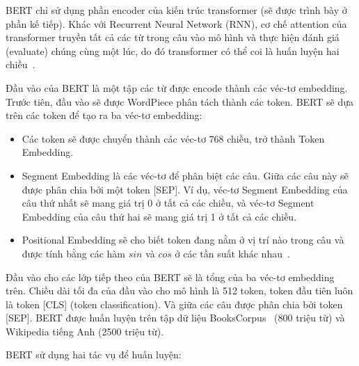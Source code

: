 BERT chỉ sử dụng phần encoder của kiến trúc transformer (sẽ được trình bày ở
phần kế tiếp). Khác với Recurrent Neural Network (RNN), cơ chế attention của
transformer truyền tất cả các từ trong câu vào mô hình và thực hiện đánh giá
(evaluate) chúng cùng một lúc, do đó transformer có thể coi là huấn luyện hai
chiều~\cite{khanhBERTModel2020}.

Đầu vào của BERT là một tập các từ được encode thành các véc-tơ embedding. Trước tiên, đầu vào sẽ được WordPiece phân tách thành các token. BERT sẽ dựa trên các token để tạo ra ba véc-tơ embedding:
\begin{itemize}
	\item Các token sẽ được chuyển thành các véc-tơ 768 chiều, trở thành Token
		Embedding.
	\item Segment Embedding là các véc-tơ để phân biệt các câu. Giữa các câu
		này sẽ được phân chia bởi một token [SEP]. Ví dụ, véc-tơ Segment
		Embedding của câu thứ nhất sẽ mang giá trị 0 ở tất cả các chiều, và
		véc-tơ Segment Embedding của câu thứ hai sẽ mang giá trị 1 ở tất cả các
		chiều.
	\item Positional Embedding sẽ cho biết token đang nằm ở vị trí nào trong
		câu và được tính bằng các hàm $sin$ và $cos$ ở các tần suất khác
		nhau~\cite{vaswaniAttentionAllYou2017}.
\end{itemize}


Đầu vào cho các lớp tiếp theo của BERT sẽ là tổng của ba véc-tơ embedding trên.
Chiều dài tối đa của đầu vào cho mô hình là 512 token, token đầu tiên luôn là
token [CLS] (token classification). Và giữa các câu được phân chia bởi token
[SEP]. BERT được huấn luyện trên tập dữ liệu
BooksCorpus~\cite{zhuAligningBooksMovies2015} (800 triệu từ) và Wikipedia tiếng
Anh (2500 triệu từ).

BERT sử dụng hai tác vụ để huấn luyện:

